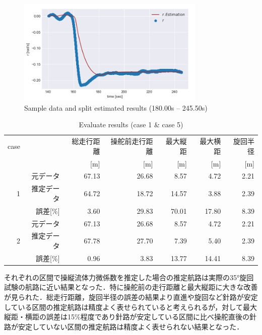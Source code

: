 \begin{figure}[htbp]
    \centering   
    \includegraphics[width=0.8\textwidth]{./img/5-7.png}
    \caption{Sample data and split estimated results (180.00s – 245.50s)}
    \label{fig:5-7_png}
\end{figure}

\begin{table}[htbp]
 \caption{Evaluate results (case 1 \& case 5)}
 \label{tb:5-4}
 \centering
  \begin{tabular}{rrrrrrr}
    \toprule
    case & & 総走行距離 & 操舵前走行距離 & 最大縦距 & 最大横距 & 旋回半径 \\
    & & [m] & [m] & [m] & [m] & [m] \\
    \midrule
    \multirow{3}{*}{1} & 元データ & 67.13 & 26.68 & 8.57 & 4.72 & 2.21 \\
         & 推定データ        & 64.72 & 18.72 & 14.57 & 3.88 & 2.39 \\
         & 誤差[\%]        & 3.60 & 29.83 & 70.01 & 17.80 & 8.39 \\
    \midrule
    \multirow{3}{*}{2} & 元データ & 67.13 & 26.68 & 8.57 & 4.72 & 2.21 \\
         & 推定データ        & 67.78 & 27.70 & 7.39 & 5.40 & 2.39 \\
         & 誤差[\%]        & 0.96 & 3.83 & 13.77 & 14.41 & 8.39 \\
    \bottomrule
  \end{tabular}
\end{table}

それぞれの区間で操縦流体力微係数を推定した場合の推定航路は実際の35°旋回試験の航路に近い結果となった．特に操舵前の走行距離と最大縦距に大きな改善が見られた．総走行距離，旋回半径の誤差の結果より直進や旋回など針路が安定している区間の推定航路は精度よく表せられていると考えられるが，対して最大縦距・横距の誤差は15\%程度であり針路が安定している区間に比べ操舵直後の針路が安定していない区間の推定航路は精度よく表せられない結果となった．

